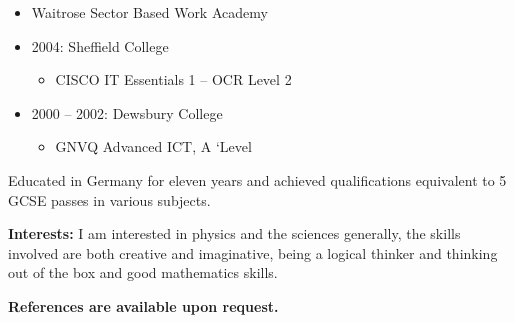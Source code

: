\documentclass[10pt,a4paper]{book}
\begin{document}
\begin{flushleft}
\begin{itemize}
\begin{itemize}
    \item Waitrose Sector Based Work Academy
    \end{itemize}
  \end{itemize}
  \begin{itemize}
  \item 2004: Sheffield College
\begin{itemize}
    \item CISCO IT Essentials 1 -- OCR Level 2
    \end{itemize}
  \end{itemize}
  \begin{itemize}
  \item 2000 -- 2002: Dewsbury College
    \begin{itemize}
    \item GNVQ Advanced ICT, A `Level
    \end{itemize}
    \end{itemize}
Educated in Germany for eleven years and achieved qualifications
equivalent to 5 GCSE passes in various subjects.
\linebreak{}

\textbf {Interests:}
I am interested in physics and the sciences generally, the skills involved are both creative and imaginative, being a logical thinker and thinking out of the box and good mathematics skills.
\linebreak{}

\textbf {References are available upon request.}
\end{flushleft}
\end{document}
